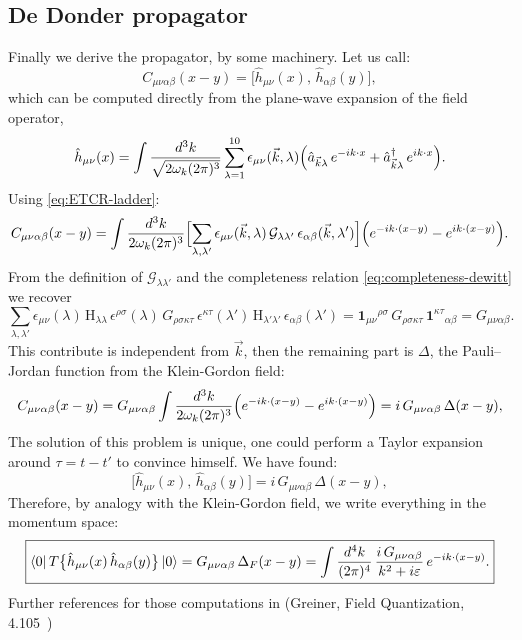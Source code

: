 \documentclass[12pt,a4paper,oneside]{article}
\numberwithin{equation}{section}   %
\begin{document}
\subsection{De Donder propagator}
Finally we derive the propagator, by some machinery. Let us call:
\begin{equation}
  C_{\mu\nu\alpha\beta}(x-y)
  = \bigl[\hat{h}_{\mu\nu}(x),\, \hat{h}_{\alpha\beta}(y)\bigr],
\end{equation}
which can be computed directly from the plane-wave expansion of the field operator,
\begin{equation}
  \hat h_{\mu\nu}(x)=\int\frac{d^3k}{\sqrt{2\omega_k(2\pi)^3}}\sum_{\lambda=1}^{10}
  \epsilon_{\mu\nu}(\vec k,\lambda)\Bigl(\hat a_{\vec k\lambda}\,e^{-ik\cdot x}
  +\hat a^\dagger_{\vec k\lambda}\,e^{ik\cdot x}\Bigr).
\end{equation}
Using \eqref{eq:ETCR-ladder}:
\begin{equation}
  C_{\mu\nu\alpha\beta}(x-y)=\int\frac{d^3k}{2\omega_k(2\pi)^3}
  \Bigl[\sum_{\lambda,\lambda'}\epsilon_{\mu\nu}(\vec k,\lambda)\,
  \mathcal G_{\lambda\lambda'}\,\epsilon_{\alpha\beta}(\vec k,\lambda')\Bigr]
  \Bigl(e^{-ik\cdot(x-y)}-e^{ik\cdot(x-y)}\Bigr).
\end{equation}
From the definition of $\mathcal G_{\lambda\lambda'}$ and the completeness
relation \eqref{eq:completeness-dewitt} we recover
\begin{equation}
  \sum_{\lambda,\lambda'}\epsilon_{\mu\nu}(\lambda)\,\mathrm{H}_{\lambda\lambda}\,
  \epsilon^{\rho\sigma}(\lambda)\,G_{\rho\sigma\kappa\tau}\,
  \epsilon^{\kappa\tau}(\lambda')\,\mathrm{H}_{\lambda'\lambda'}\,\epsilon_{\alpha\beta}(\lambda')
  =\mathbf 1_{\mu\nu}{}^{\rho\sigma}\,G_{\rho\sigma\kappa\tau}\,
  \mathbf 1^{\kappa\tau}{}_{\alpha\beta}
  =G_{\mu\nu\alpha\beta}.
\end{equation}
This contribute is independent from $\vec{k}$, then the remaining part
 is $\Delta$, the Pauli--Jordan function
from the Klein-Gordon field:
\begin{equation}
  C_{\mu\nu\alpha\beta}(x-y)=G_{\mu\nu\alpha\beta}\int\frac{d^3k}{2\omega_k(2\pi)^3}
  \Bigl(e^{-ik\cdot(x-y)}-e^{ik\cdot(x-y)}\Bigr)
  = i\,G_{\mu\nu\alpha\beta}\,\Delta(x-y),
\end{equation}
The solution of this problem is unique, one could perform a Taylor
expansion around $\tau=t-t'$ to convince himself. We have found:
\begin{equation}
  \bigl[\hat{h}_{\mu\nu}(x),\, \hat{h}_{\alpha\beta}(y)\bigr]
  = i\, G_{\mu\nu\alpha\beta}\, \Delta(x-y),
\end{equation}
Therefore, by analogy with the Klein-Gordon field, 
we write everything in the momentum space:
\begin{equation}
\boxed{
  \bra{0} T\bigl\{\hat{h}_{\mu\nu}(x)\, \hat{h}_{\alpha\beta}(y)\bigr\} \ket{0}
  = G_{\mu\nu\alpha\beta}\, \Delta_F(x-y)
  = \int \frac{d^4k}{(2\pi)^4}\,
    \frac{i\, G_{\mu\nu\alpha\beta}}{k^2 + i\varepsilon}\, e^{-ik\cdot(x-y)} .
}
\end{equation}
Further references for those computations in (Greiner, Field Quantization, 4.105~\cite{GreinerFQ})
\end{document}
